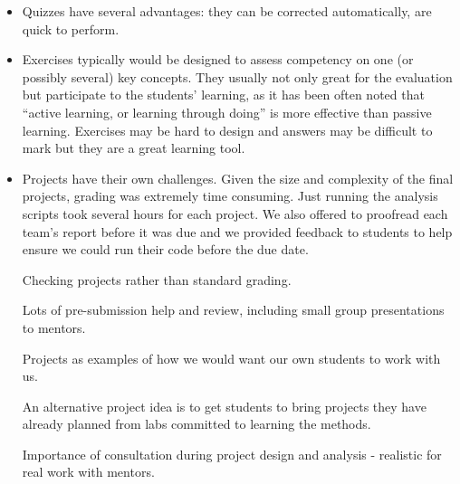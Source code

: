 \begin{itemize}

\item Quizzes have several advantages: they can be corrected automatically, are
quick to perform.

\item %
Exercises typically would be designed to assess competency on one (or
possibly several) key concepts. %
They usually not only great for the evaluation but participate to the students'
learning, as it has been often noted that ``active learning, or learning
through doing'' is more effective than passive learning.
Exercises may be hard to design and answers may be difficult to mark but they
are a great learning tool.

\item Projects have their own challenges.
Given the size and complexity of the final projects, grading was extremely time
consuming.
Just running the analysis scripts took several hours for each project.
We also offered to proofread each team's report before it was due and
we provided feedback to students to help ensure we could run their
code before the due date.

Checking projects rather than standard grading.

Lots of pre-submission help and review, including small group presentations to
mentors.

Projects as examples of how we would want our own students to work with us.

An alternative project idea is to get students to bring projects they have
already planned from labs committed to learning the methods.

Importance of consultation during project design and analysis - realistic for
real work with mentors.



\end{itemize}
